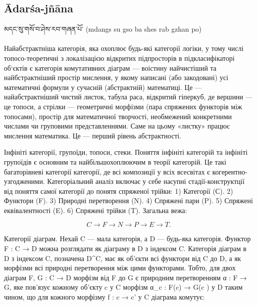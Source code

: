 \newpage
\subsection*{Ādarśa-jñāna}

\ti མདང་སུ་གསོ་བ་ཤེས་རབ་གཞན་པོ་  \ua (mdangs su gso ba shes rab gzhan po)\\
\\
Найабстрактніша категорія, яка охоплює будь-які категорії логіки, у тому числі топосо-теоретичні з локалізацією відкритих підпросторів в підкласифікаторі об‘єктів є категорія комутативних діаграм — воістину найчистіший та найбстрактніший простір мислення, у якому написані (або закодовані) усі математичні формули у сучасній (абстрактній) математиці. Це — найабстрактніший чистий листок, табула раса, відкритий гіперкуб, де вершини — це топоси, а стрілки — геометричні морфізми (пара спряжених функторів між топосами), простір для математичної творчості, необмежений конкретними числами чи груповими представленнями. Саме на цьому «листку» працює мислення математика. Це — перший рівень абстрактності.

Інфініті категорії, групоїди, топоси, стеки. Поняття інфініті категорій та інфініті групоїдів є основним та найбільшохоплюючим в теорії категорій. Це такі багаторівневі категорії категорії, де всі композиції у всіх всесвітах є когерентно-узгодженими. Категоріальний аналіз включає у себе насупні стадії-конструктції від поняття самої категорії до понятя спряженої трійки: 1) Категорії (С). 2) Функтори (F). 3) Природні перетворення (N). 4) Спряжені пари (P). 5) Спряжені еквівалентності (E). 6) Спряжені трійки (T). Загальна вежа:

$$
C \rightarrow F \rightarrow N \rightarrow P \rightarrow E \rightarrow T.
$$

Категорії діаграм. Нехай C — мала категорія, а D — будь-яка категорія. Функтор F : C → D можна розглядати як діаграму в D з індексом C. Категорія діаграм в D з індексом C, позначена D^C, має як об'єкти всі функтори від C до D, а як морфізми всі природні перетворення між цими функторами. Тобто, для двох діаграм F, G : C → D морфізм від F до G є природним перетворенням α : F → G, яке пов'язує кожному об'єкту c у C морфізм α_c : F(c) → G(c ) у D таким чином, що для кожного морфізму f : c → c' у C діаграма комутує: 

\begin{center}
\end{center}

